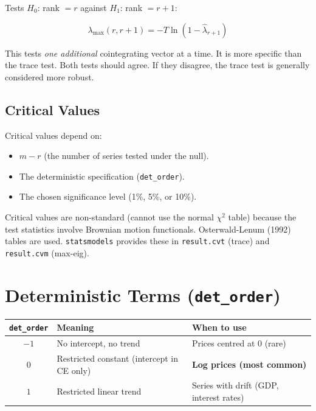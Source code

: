 \documentclass[12pt, a4paper]{article}
\begin{document}
Tests $H_0$: rank $= r$ against $H_1$: rank $= r+1$:

\begin{equation}
    \boxed{ \lambda_{\max}(r, r+1) = -T \ln(1 - \hat{\lambda}_{r+1}) }
    \label{eq:maxeig}
\end{equation}

This tests \emph{one additional} cointegrating vector at a time. It is more specific than the trace test.
Both tests should agree. If they disagree, the trace test is generally considered more robust.

\subsection{Critical Values}

Critical values depend on:
\begin{itemize}
    \item $m - r$ (the number of series tested under the null).
    \item The deterministic specification (\texttt{det\_order}).
    \item The chosen significance level (1\%, 5\%, or 10\%).
\end{itemize}

Critical values are non-standard (cannot use the normal $\chi^2$ table) because the test 
statistics involve Brownian motion functionals. Osterwald-Lenum (1992) tables are used.
\texttt{statsmodels} provides these in \texttt{result.cvt} (trace) and \texttt{result.cvm} (max-eig).

\section{Deterministic Terms (\texttt{det\_order})}

\begin{center}
\begin{tabular}{@{}cll@{}}
\toprule
\texttt{det\_order} & Meaning & When to use \\
\midrule
$-1$ & No intercept, no trend & Prices centred at 0 (rare) \\
$0$  & Restricted constant (intercept in CE only) & \textbf{Log prices (most common)} \\
$1$  & Restricted linear trend & Series with drift (GDP, interest rates) \\
\bottomrule
\end{tabular}
\end{center}
\end{document}

